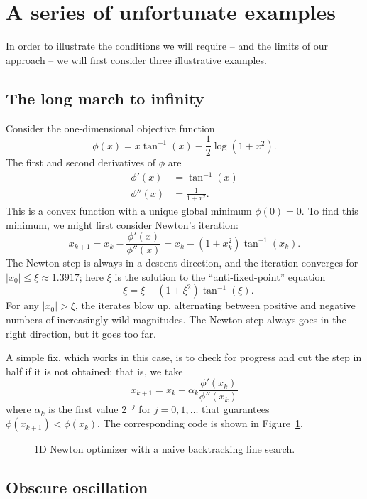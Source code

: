 \documentclass[12pt, leqno]{article} %
\begin{document}
\section{A series of unfortunate examples}

In order to illustrate the conditions we will require -- and the
limits of our approach -- we will first consider three illustrative
examples.

\subsection{The long march to infinity}

Consider the one-dimensional objective function
\[
  \phi(x) = x \tan^{-1}(x) - \frac{1}{2} \log(1+x^2).
\]
The first and second derivatives of $\phi$ are
\begin{align*}
  \phi'(x) &= \tan^{-1}(x) \\
  \phi''(x) &= \frac{1}{1+x^2}.
\end{align*}
This is a convex function with a unique global minimum $\phi(0) = 0$.
To find this minimum, we might first consider Newton's iteration:
\[
  x_{k+1} = x_k - \frac{\phi'(x)}{\phi''(x)} = x_k - (1+x_k^2) \tan^{-1}(x_k).
\]
The Newton step is always in a descent direction, and
the iteration converges for $|x_0| \leq \xi \approx 1.3917$; here
$\xi$ is the solution to the ``anti-fixed-point'' equation
\[
  -\xi = \xi - (1+\xi^2) \tan^{-1}(\xi).
\]
For any $|x_0| > \xi$, the iterates blow up, alternating between
positive and negative numbers of increasingly wild magnitudes.
The Newton step always goes in the right direction, but it goes too
far.

A simple fix, which works in this case, is to check for progress
and cut the step in half if it is not obtained; that is, we take
\[
  x_{k+1} = x_k - \alpha_k \frac{\phi'(x_k)}{\phi''(x_k)}
\]
where $\alpha_k$ is the first value $2^{-j}$ for $j = 0, 1, \ldots$
that guarantees $\phi(x_{k+1}) < \phi(x_k)$.  The corresponding code
is shown in Figure~\ref{fig:newton-naive-ls}.

\begin{figure}
  
  \caption{1D Newton optimizer with a naive backtracking line search.}
  \label{fig:newton-naive-ls}
\end{figure}

\subsection{Obscure oscillation}
\end{document}
